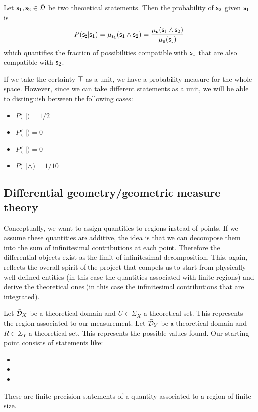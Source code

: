 \documentclass[11pt,letterpaper,fleqn]{memoir} %
\begin{document}
Let $\stmt_1, \stmt_2 \in \tdomain$ be two theoretical statements. Then the probability of $\stmt_2$ given $\stmt_1$ is
\begin{equation}
P(\stmt_2 | \stmt_1) = \mu_{\stmt_1}(\stmt_1 \AND \stmt_2) = \frac{\mu_{\stmt[u]}(\stmt_1 \AND \stmt_2)}{\mu_{\stmt[u]}(\stmt_1)}
\end{equation}
which quantifies the fraction of possibilities compatible with $\stmt_1$ that are also compatible with $\stmt_2$.

If we take the certainty $\certainty$ as a unit, we have a probability measure for the whole space. However, since we can take different statements as a unit, we will be able to distinguish between the following cases:
\begin{itemize}
	\item $P($ $|$$)=1/2$
	\item $P($ $|$$)=0$
	\item $P($ $|$$)=0$
	\item $P($ $|$$\AND$$)=1/10$
\end{itemize}

\subsection{Differential geometry/geometric measure theory}

Conceptually, we want to assign quantities to regions instead of points. If we assume these quantities are additive, the idea is that we can decompose them into the sum of infinitesimal contributions at each point. Therefore the differential objects exist as the limit of infinitesimal decomposition. This, again, reflects the overall spirit of the project that compels us to start from physically well defined entities (in this case the quantities associated with finite regions) and derive the theoretical ones (in this case the infinitesimal contributions that are integrated).

Let $\tdomain_X$ be a theoretical domain and $U \in \Sigma_X$ a theoretical set. This represents the region associated to our measurement. Let $\tdomain_Y$ be a theoretical domain and $R \in \Sigma_Y$ a theoretical set. This represents the possible values found. Our starting point consists of statements like:
\begin{itemize}
	\item {}
	\item {}
	\item {}
\end{itemize}
These are finite precision statements of a quantity associated to a region of finite size.
\end{document}
